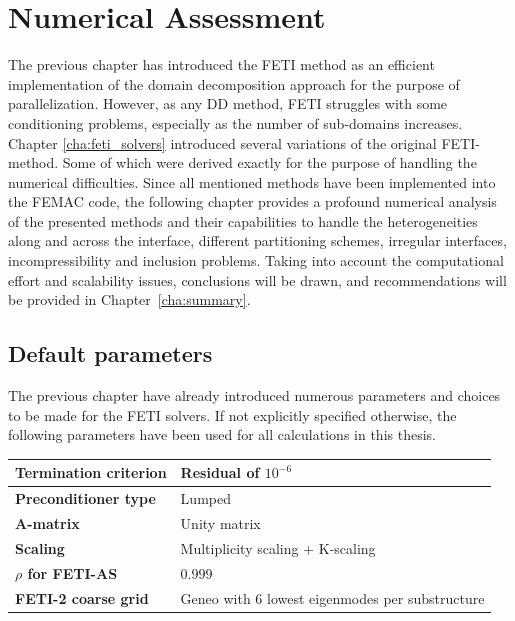\chapter{Numerical Assessment}\label{cha:numerical_assesment}
The previous chapter has introduced the FETI method as an efficient implementation of the domain decomposition approach for the purpose of parallelization. However, as any DD method, FETI struggles with some conditioning problems, especially as the number of sub-domains increases.\\
Chapter \ref{cha:feti_solvers} introduced several variations of the original FETI-method. Some of which were derived exactly for the purpose of handling the numerical difficulties. Since all mentioned methods have been implemented into the FEMAC code\cite{FEMAC}, the following chapter provides a profound numerical analysis of the presented methods and their capabilities to handle the heterogeneities along and across the interface, different partitioning schemes, irregular interfaces, incompressibility and inclusion problems. Taking into account the computational effort and scalability issues, conclusions will be drawn, and recommendations will be provided in Chapter~\ref{cha:summary}.
\\
\section{Default parameters}\label{sec:default_parameters}
The previous chapter have already introduced numerous parameters and choices to be made for the FETI solvers. If not explicitly specified otherwise, the following parameters have been used for all calculations in this thesis.
\\
\begin{center}
  \begin{tabular}{|l|l|}
    \hline
    \textbf{Termination criterion} &Residual of $10^{-6}$ \\
    \hline
    \textbf{Preconditioner type}   & Lumped                                               \\
    \hline
    \textbf{A-matrix}              & Unity matrix                                         \\
    \hline
    \textbf{Scaling}               & Multiplicity scaling                                 + K-scaling \\
    \hline
    \textbf{$\rho$ for FETI-AS}    & $0.999$                                               \\
    \hline
    \textbf{FETI-2 coarse grid}    & Geneo with 6 lowest eigenmodes per substructure                            \\
    \hline
  \end{tabular}
\end{center}


